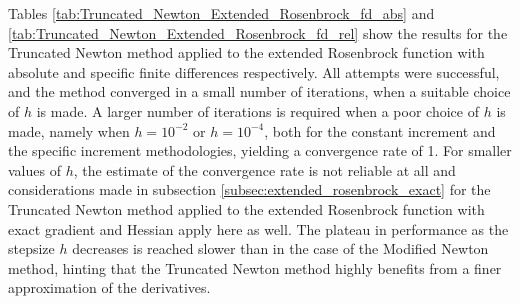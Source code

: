 Tables \ref{tab:Truncated_Newton_Extended_Rosenbrock_fd_abs} and \ref{tab:Truncated_Newton_Extended_Rosenbrock_fd_rel} show the results for the Truncated Newton method applied to the extended Rosenbrock function with absolute and specific finite differences respectively.
All attempts were successful, and the method converged in a small number of iterations, when a suitable choice of $h$ is made.
A larger number of iterations is required when a poor choice of $h$ is made, namely when $h=10^{-2}$ or $h=10^{-4}$, both for the constant increment and the specific increment methodologies, yielding a convergence rate of 1.
For smaller values of $h$, the estimate of the convergence rate is not reliable at all and considerations made in subsection \ref{subsec:extended_rosenbrock_exact} for the Truncated Newton method applied to the extended Rosenbrock function with exact gradient and Hessian apply here as well.
The plateau in performance as the stepsize $h$ decreases is reached slower than in the case of the Modified Newton method, hinting that the Truncated Newton method highly benefits from a finer approximation of the derivatives.

